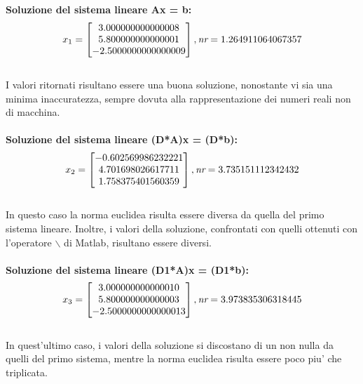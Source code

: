 \documentclass[10pt,a4paper]{article}
\begin{document}
\textbf{Soluzione del sistema lineare Ax = b:}
\[
  x_1 =
  \begin{bmatrix}
    3.000000000000008 \\
    5.800000000000001 \\
    -2.5000000000000009
  \end{bmatrix},
  \\
  \textit{nr} = 1.264911064067357
\]
\\
I valori ritornati risultano essere una buona soluzione, nonostante vi sia
una minima inaccuratezza, sempre dovuta alla rappresentazione dei
numeri reali non di macchina.
\\\\
\textbf{Soluzione del sistema lineare (D*A)x = (D*b):}
\[
  x_2 =
  \begin{bmatrix}
    -0.602569986232221 \\
    4.701698026617711  \\
    1.758375401560359
  \end{bmatrix},
  \\
  \textit{nr} = 3.735151112342432
\]
\\
In questo caso la norma euclidea risulta essere diversa da quella del primo
sistema lineare. Inoltre, i valori della soluzione, confrontati
con quelli ottenuti con l'operatore $ \backslash $ di Matlab, risultano
essere diversi.
\\\\
\textbf{Soluzione del sistema lineare (D1*A)x = (D1*b):}
\[
  x_3 =
  \begin{bmatrix}
    3.000000000000010 \\
    5.800000000000003 \\
    -2.5000000000000013
  \end{bmatrix},
  \\
  \textit{nr} = 3.973835306318445
\]
\\
In quest'ultimo caso, i valori della soluzione si discostano di un non nulla
da quelli del primo sistema, mentre la norma euclidea risulta essere poco
piu' che triplicata.
\end{document}
